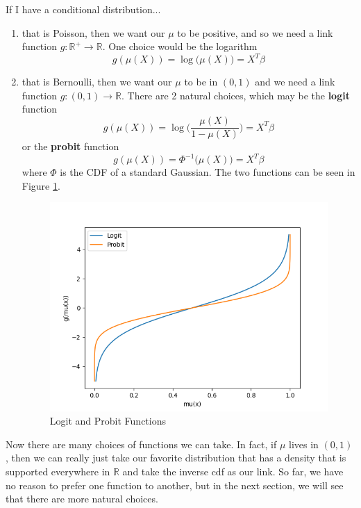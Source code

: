 \documentclass{article}
\begin{document}
    \begin{example}
    If I have a conditional distribution... 
    \begin{enumerate}
        \item that is Poisson, then we want our $\mu$ to be positive, and so we need a link function $g: \mathbb{R}^+ \rightarrow \mathbb{R}$. One choice would be the logarithm 
        \[g(\mu(X)) = \log \big( \mu(X) \big) = X^T \beta\]

        \item that is Bernoulli, then we want our $\mu$ to be in $(0, 1)$ and we need a link function $g: (0, 1) \rightarrow \mathbb{R}$. There are 2 natural choices, which may be the \textbf{logit} function 
        \[g(\mu(X)) = \log \bigg( \frac{\mu(X)}{1 - \mu(X)} \bigg) = X^T \beta\]
        or the \textbf{probit} function 
        \[g(\mu(X)) = \Phi^{-1} \big(\mu(X)\big) = X^T \beta \]
        where $\Phi$ is the CDF of a standard Gaussian. The two functions can be seen in Figure \ref{fig:logit_probit}. 
        \begin{figure}[H]
            \centering
            \includegraphics[scale=0.5]{img/probit_logit.png}
            \caption{Logit and Probit Functions}
            \label{fig:logit_probit}
        \end{figure}
    \end{enumerate}
    \end{example}

    Now there are many choices of functions we can take. In fact, if $\mu$ lives in $(0, 1)$, then we can really just take our favorite distribution that has a density that is supported everywhere in $\mathbb{R}$ and take the inverse cdf as our link. So far, we have no reason to prefer one function to another, but in the next section, we will see that there are more natural choices. 
\end{document}
